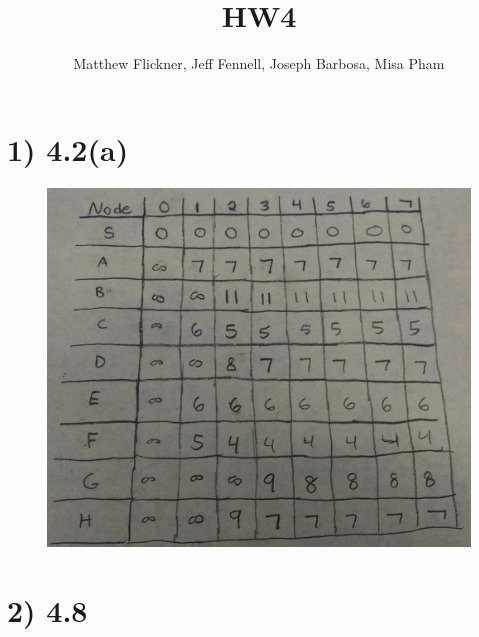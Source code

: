 \documentclass[a4paper]{article}
\title{HW4}
\author{Matthew Flickner, Jeff Fennell, Joseph Barbosa, Misa Pham}
\begin{document}
\maketitle

\section*{1) 4.2(a)}

\begin{figure}[hb]
\centering
\includegraphics[width=1.0\textwidth]{problem1.jpg}
\end{figure}

\section*{2) 4.8}
\end{document}
